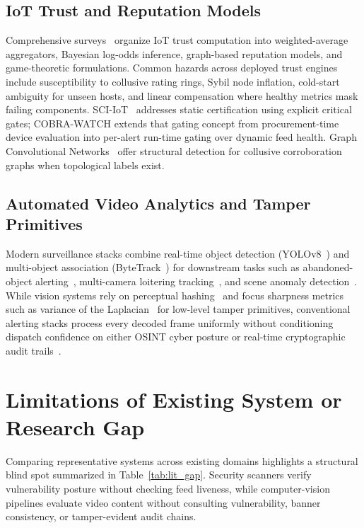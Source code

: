 \subsection{IoT Trust and Reputation Models}
Comprehensive surveys~\cite{ferraris2024trust,iottrust2023slr,biot2026trust} organize IoT trust computation into weighted-average aggregators, Bayesian log-odds inference, graph-based reputation models, and game-theoretic formulations. Common hazards across deployed trust engines include susceptibility to collusive rating rings, Sybil node inflation, cold-start ambiguity for unseen hosts, and linear compensation where healthy metrics mask failing components. SCI-IoT~\cite{swami2025sciiot} addresses static certification using explicit critical gates; COBRA-WATCH extends that gating concept from procurement-time device evaluation into per-alert run-time gating over dynamic feed health. Graph Convolutional Networks~\cite{kipf2017gcn} offer structural detection for collusive corroboration graphs when topological labels exist.

\subsection{Automated Video Analytics and Tamper Primitives}
Modern surveillance stacks combine real-time object detection (YOLOv8~\cite{jocher2023yolov8}) and multi-object association (ByteTrack~\cite{zhang2022bytetrack}) for downstream tasks such as abandoned-object alerting~\cite{luna2018aod,yilmazer2025abandoned}, multi-camera loitering tracking~\cite{nayak2019loitering}, and scene anomaly detection~\cite{rasal2025suspicious,liu2025epipolar}. While vision systems rely on perceptual hashing~\cite{zauner2010phash} and focus sharpness metrics such as variance of the Laplacian~\cite{pech2000focus} for low-level tamper primitives, conventional alerting stacks process every decoded frame uniformly without conditioning dispatch confidence on either OSINT cyber posture or real-time cryptographic audit trails~\cite{merkle1987}.

\section{Limitations of Existing System or Research Gap}
Comparing representative systems across existing domains highlights a structural blind spot summarized in Table~\ref{tab:lit_gap}. Security scanners verify vulnerability posture without checking feed liveness, while computer-vision pipelines evaluate video content without consulting vulnerability, banner consistency, or tamper-evident audit chains.

